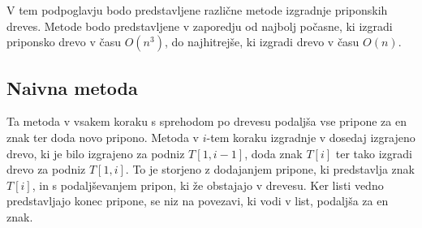 V tem podpoglavju bodo predstavljene različne metode izgradnje priponskih dreves. Metode bodo predstavljene v zaporedju od najbolj počasne, ki izgradi priponsko drevo v času $O(n^3)$, do najhitrejše, ki izgradi drevo v času $O(n)$. 

\subsection{Naivna metoda}
Ta metoda v vsakem koraku s sprehodom po drevesu podaljša vse pripone za en znak ter doda novo pripono. Metoda v $i$-tem koraku izgradnje v dosedaj izgrajeno drevo, ki je bilo izgrajeno za podniz $T[1,i-1]$, doda znak $T[i]$ ter tako izgradi drevo za podniz $T[1,i]$. To je storjeno z dodajanjem pripone, ki predstavlja znak $T[i]$, in s podaljševanjem pripon, ki že obstajajo v drevesu. Ker listi vedno predstavljajo konec pripone, se niz na povezavi, ki vodi v list, podaljša za en znak.

